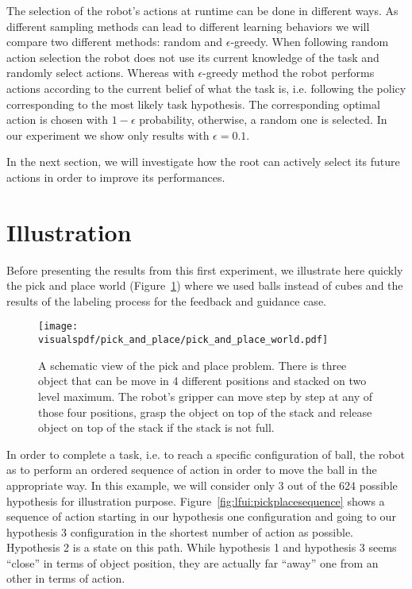 The selection of the robot's actions at runtime can be done in different ways. As different sampling methods can lead to different learning behaviors we will compare two different methods: random and  $\epsilon$-greedy. When following random action selection the robot does not use its current knowledge of the task and randomly select actions. Whereas with $\epsilon$-greedy method the robot performs actions according to the current belief of what the task is, i.e. following the policy corresponding to the most likely task hypothesis. The corresponding optimal action is chosen with $1-\epsilon$ probability, otherwise, a random one is selected. In our experiment we show only results with $\epsilon =  0.1$.

In the next section, we will investigate how the root can actively select its future actions in order to improve its performances.

\section{Illustration}

Before presenting the results from this first experiment, we illustrate here quickly the pick and place world (Figure~\ref{fig:lfui:pickplaceworld}) where we used balls instead of cubes and the results of the labeling process for the feedback and guidance case.

\begin{figure}[!ht]
  \centering
  \texttt{[image: \\visualspdf/pick\_and\_place/pick\_and\_place\_world.pdf]}
  \caption{A schematic view of the pick and place problem. There is three object that can be move in 4 different positions and stacked on two level maximum. The robot's gripper can move step by step at any of those four positions, grasp the object on top of the stack and release object on top of the stack if the stack is not full.}
  \label{fig:lfui:pickplaceworld}
\end{figure}

In order to complete a task, i.e. to reach a specific configuration of ball, the robot as to perform an ordered sequence of action in order to move the ball in the appropriate way. In this example, we will consider only 3 out of the 624 possible hypothesis for illustration purpose. Figure~\ref{fig:lfui:pickplacesequence} shows a sequence of action starting in our hypothesis one configuration and going to our hypothesis 3 configuration in the shortest number of action as possible. Hypothesis 2 is a state on this path. While hypothesis 1 and hypothesis 3 seems ``close'' in terms of object position, they are actually far ``away'' one from an other in terms of action.

